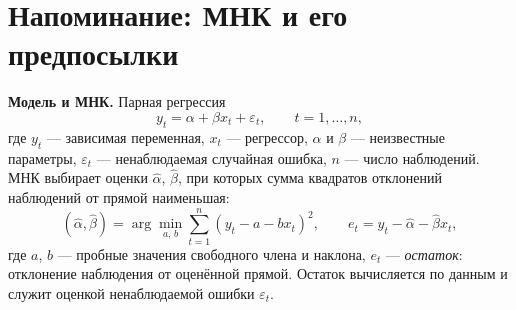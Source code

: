 %
%
%
%
%


\ifsolutions

\section*{Напоминание: МНК и его предпосылки}

\textbf{Модель и МНК.} Парная регрессия
\[
  y_t = \alpha + \beta x_t + \varepsilon_t, \qquad t = 1, \dots, n,
\]
где $y_t$ — зависимая переменная, $x_t$ — регрессор, $\alpha$ и $\beta$ —
неизвестные параметры, $\varepsilon_t$ — ненаблюдаемая случайная ошибка,
$n$ — число наблюдений. МНК выбирает оценки $\widehat\alpha$, $\widehat\beta$,
при которых сумма квадратов отклонений наблюдений от прямой наименьшая:
\[
  (\widehat\alpha,\widehat\beta) = \arg\min_{a,\,b}\sum_{t=1}^n(y_t - a - bx_t)^2,
  \qquad
  e_t = y_t - \widehat\alpha - \widehat\beta x_t ,
\]
где $a$, $b$ — пробные значения свободного члена и наклона, $e_t$ —
\emph{остаток}: отклонение наблюдения от оценённой прямой. Остаток вычисляется
по данным и служит оценкой ненаблюдаемой ошибки $\varepsilon_t$.

